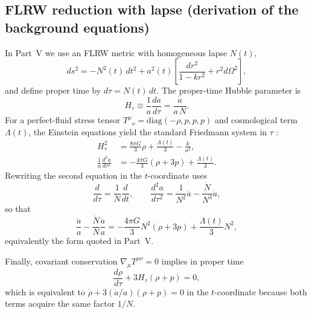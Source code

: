 \subsection{FLRW reduction with lapse (derivation of the background equations)}
\label{app:frw_lapse_derivation}
In Part~V we use an FLRW metric with homogeneous lapse $N(t)$,
\begin{equation}
    ds^2=-N^2(t)\,dt^2+a^2(t)\left[\frac{dr^2}{1-kr^2}+r^2 d\Omega^2\right],
\end{equation}
and define proper time by $d\tau=N(t)\,dt$. The proper-time Hubble parameter is
\begin{equation}
    H_\tau\equiv \frac{1}{a}\frac{da}{d\tau}=\frac{\dot a}{a\,N}.
\end{equation}
For a perfect-fluid stress tensor $T^{\mu}{}_{\nu}=\mathrm{diag}(-\rho,p,p,p)$ and cosmological term $\Lambda(t)$, the Einstein equations yield the standard Friedmann system in $\tau$ \cite{Dodelson2003,Carroll2004}:
\begin{align}
    H_\tau^2 &= \frac{8\pi G}{3}\rho + \frac{\Lambda(t)}{3} - \frac{k}{a^2},\\
    \frac{1}{a}\frac{d^2a}{d\tau^2} &= -\frac{4\pi G}{3}\left(\rho+3p\right) + \frac{\Lambda(t)}{3}.
\end{align}
Rewriting the second equation in the $t$-coordinate uses
\begin{equation}
    \frac{d}{d\tau}=\frac{1}{N}\frac{d}{dt},\qquad
    \frac{d^2a}{d\tau^2}=\frac{1}{N^2}\ddot a-\frac{\dot N}{N^3}\dot a,
\end{equation}
so that
\begin{equation}
    \frac{\ddot a}{a}-\frac{\dot N}{N}\frac{\dot a}{a}
    =
    -\frac{4\pi G}{3}N^2(\rho+3p)+\frac{\Lambda(t)}{3}N^2,
\end{equation}
equivalently the form quoted in Part~V.

Finally, covariant conservation $\nabla_\mu T^{\mu\nu}=0$ implies in proper time
\begin{equation}
    \frac{d\rho}{d\tau}+3H_\tau(\rho+p)=0,
\end{equation}
which is equivalent to $\dot\rho+3(\dot a/a)(\rho+p)=0$ in the $t$-coordinate because both terms acquire the same factor $1/N$.


